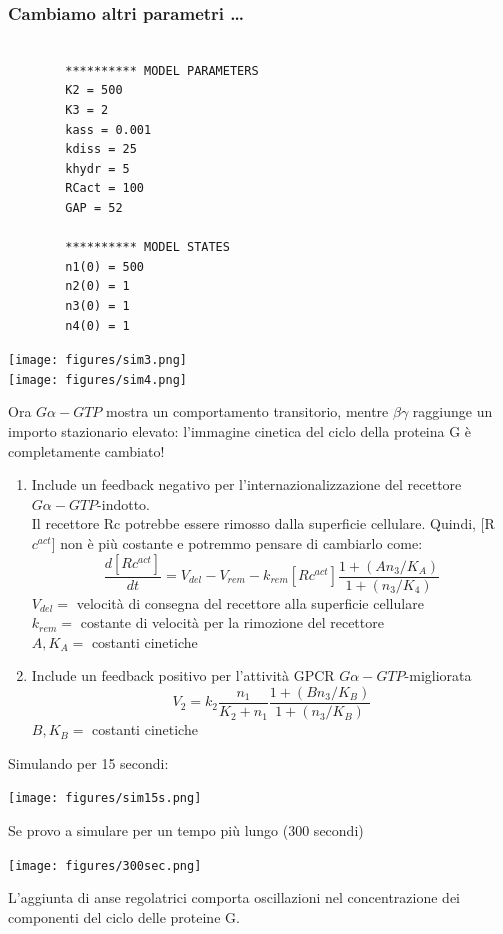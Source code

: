 \documentclass{article}
\begin{document}
\subsubsection*{Cambiamo altri parametri \dots}
\begin{minipage}[c]{.5\textwidth}
    \centering
    \begin{verbatim}

        ********** MODEL PARAMETERS
        K2 = 500
        K3 = 2
        kass = 0.001
        kdiss = 25
        khydr = 5
        RCact = 100
        GAP = 52
    
        ********** MODEL STATES
        n1(0) = 500
        n2(0) = 1
        n3(0) = 1
        n4(0) = 1

    \end{verbatim}
\end{minipage}%
\begin{minipage}[c]{.5\textwidth}
    \centering
    \texttt{[image: figures/sim3.png]}\\
    \texttt{[image: figures/sim4.png]}
\end{minipage}
Ora $G\alpha - GTP$ mostra un comportamento transitorio, mentre $\beta \gamma$ raggiunge un importo stazionario elevato: l'immagine cinetica del ciclo della proteina G è completamente cambiato!
\begin{enumerate}
    \item Include un feedback negativo per l'internazionalizzazione del recettore $G\alpha - GTP$-indotto.\\Il recettore Rc potrebbe essere rimosso dalla superficie cellulare. Quindi, [R$c^{act}$] non è più costante e potremmo pensare di cambiarlo come:
    $$\frac{d[Rc^{act}]}{dt} = V_{del} - V_{rem} - k_{rem}[Rc^{act}]\frac{1 + (An_3/K_A)}{1 + (n_3 / K_4)}$$
    $V_{del} = $ velocità di consegna del recettore alla superficie cellulare\\
    $k_{rem} = $ costante di velocità per la rimozione del recettore\\
    $A, K_A = $ costanti cinetiche
    \item Include un feedback positivo per l'attività GPCR $G\alpha -GTP$-migliorata
    $$ V_2 = k_2\frac{n_1}{K_2 + n_1} \frac{1 + (Bn_3 / K_B)}{ 1 + (n_3 / K_B)}$$
    $B,K_B = $ costanti cinetiche
\end{enumerate}
Simulando per 15 secondi:
\begin{center}
    \texttt{[image: figures/sim15s.png]}
\end{center}
Se provo a simulare per un tempo più lungo (300 secondi)
\begin{center}
    \texttt{[image: figures/300sec.png]}
\end{center}
L'aggiunta di anse regolatrici comporta oscillazioni nel
concentrazione dei componenti del ciclo delle proteine G.
\end{document}
